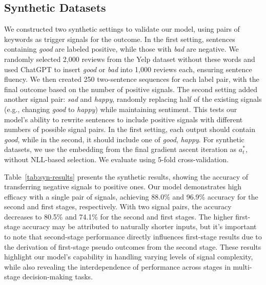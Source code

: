 \documentclass{article}
\begin{document}
\subsection{Synthetic Datasets}
We constructed two synthetic settings to validate our model, using pairs of keywords as trigger signals for the outcome. In the first setting, sentences containing \textit{good} are labeled positive, while those with \textit{bad} are negative. We randomly selected 2,000 reviews from the Yelp dataset without these words and used ChatGPT to insert \textit{good} or \textit{bad} into 1,000 reviews each, ensuring sentence fluency. We then created 250 two-sentence sequences for each label pair, with the final outcome based on the number of positive signals. The second setting added another signal pair: \textit{sad} and \textit{happy}, randomly replacing half of the existing signals (e.g., changing \textit{good} to \textit{happy}) while maintaining sentiment. This tests our model's ability to rewrite sentences to include positive signals with different numbers of possible signal pairs. In the first setting, each output should contain \textit{good}, while in the second, it should include one of {\textit{good}, \textit{happy}}. For synthetic datasets, we use the embedding from the final gradient ascent iteration as $a^*_t$, without NLL-based selection. We evaluate using 5-fold cross-validation.

Table~\ref{tab:syn-results} presents the synthetic results, showing the accuracy of transferring negative signals to positive ones. Our model demonstrates high efficacy with a single pair of signals, achieving 88.0\% and 96.9\% accuracy for the second and first stages, respectively. With two signal pairs, the accuracy decreases to 80.5\% and 74.1\% for the second and first stages. The higher first-stage accuracy may be attributed to naturally shorter inputs, but it's important to note that second-stage performance directly influences first-stage results due to the derivation of first-stage pseudo outcomes from the second stage. These results highlight our model's capability in handling varying levels of signal complexity, while also revealing the interdependence of performance across stages in multi-stage decision-making tasks.

\begin{table}[htbp]
\begin{tiny}
    \centering
    \caption{\small Synthetic data performance. The numbers represent the accuracy of converting negative signals into positive signals.}
    \label{tab:syn-results}
    \end{tiny}
\end{table}
\end{document}
